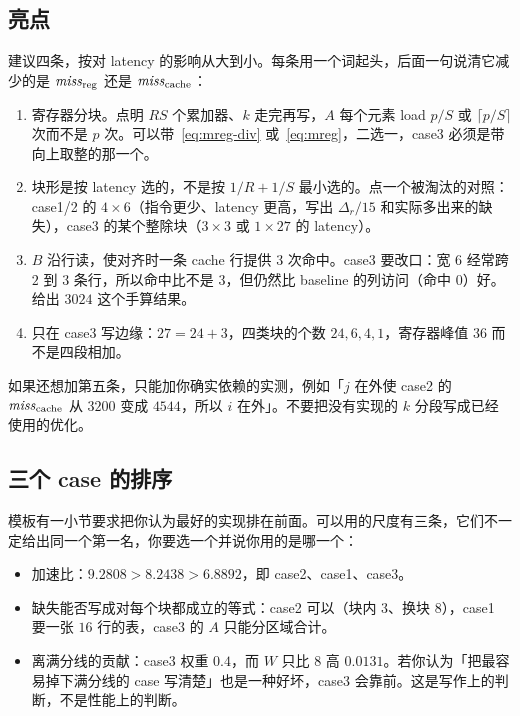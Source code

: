 \subsection{亮点}

建议四条，按对 latency 的影响从大到小。每条用一个词起头，后面一句说清它减少的是 $\mathit{miss}_{\mathrm{reg}}$ 还是 $\mathit{miss}_{\mathrm{cache}}$：

\begin{enumerate}
  \item 寄存器分块。点明 $RS$ 个累加器、$k$ 走完再写，$A$ 每个元素 load $p/S$ 或 $\lceil p/S\rceil$ 次而不是 $p$ 次。可以带~\eqref{eq:mreg-div} 或~\eqref{eq:mreg}，二选一，case3 必须是带向上取整的那一个。
  \item 块形是按 latency 选的，不是按 $1/R+1/S$ 最小选的。点一个被淘汰的对照：case1/2 的 $4\times6$（指令更少、latency 更高，写出 $\Delta_r/15$ 和实际多出来的缺失），case3 的某个整除块（$3\times3$ 或 $1\times27$ 的 latency）。
  \item $B$ 沿行读，使对齐时一条 cache 行提供 $3$ 次命中。case3 要改口：宽 $6$ 经常跨 $2$ 到 $3$ 条行，所以命中比不是 $3$，但仍然比 baseline 的列访问（命中 $0$）好。给出 $3024$ 这个手算结果。
  \item 只在 case3 写边缘：$27=24+3$，四类块的个数 $24,6,4,1$，寄存器峰值 $36$ 而不是四段相加。
\end{enumerate}

如果还想加第五条，只能加你确实依赖的实测，例如「$j$ 在外使 case2 的 $\mathit{miss}_{\mathrm{cache}}$ 从 $3200$ 变成 $4544$，所以 $i$ 在外」。不要把没有实现的 $k$ 分段写成已经使用的优化。

\subsection{三个 case 的排序}

模板有一小节要求把你认为最好的实现排在前面。可以用的尺度有三条，它们不一定给出同一个第一名，你要选一个并说你用的是哪一个：

\begin{itemize}
  \item 加速比：$9.2808 > 8.2438 > 6.8892$，即 case2、case1、case3。
  \item 缺失能否写成对每个块都成立的等式：case2 可以（块内 $3$、换块 $8$），case1 要一张 $16$ 行的表，case3 的 $A$ 只能分区域合计。
  \item 离满分线的贡献：case3 权重 $0.4$，而 $W$ 只比 $8$ 高 $0.0131$。若你认为「把最容易掉下满分线的 case 写清楚」也是一种好坏，case3 会靠前。这是写作上的判断，不是性能上的判断。
\end{itemize}

